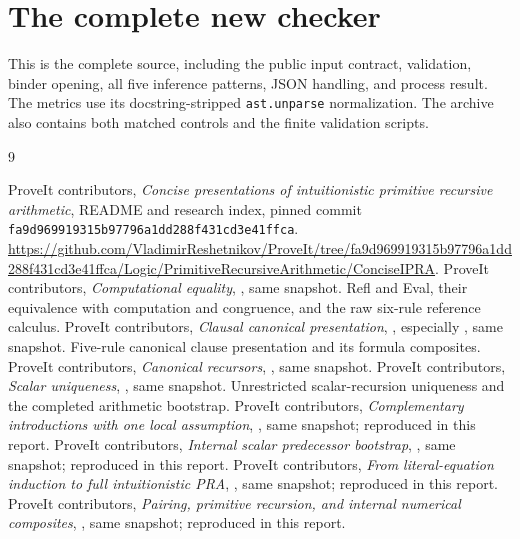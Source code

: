 \documentclass[11pt,letterpaper]{article}
\theoremstyle{definition}
\newcommand{\code}[1]{\texttt{#1}}
\begin{document}
\section{The complete new checker}
\label{app:checker}
This is the complete source, including the public input contract,
validation, binder opening, all five inference patterns, JSON handling,
and process result. The metrics use its docstring-stripped
\code{ast.unparse} normalization. The archive also contains both matched
controls and the finite validation scripts.

\clearpage
\begin{thebibliography}{9}
\small\raggedright
{}
ProveIt contributors, \emph{Concise presentations of intuitionistic primitive
recursive arithmetic}, README and research index, pinned commit
\texttt{fa9d969919315b97796a1dd288f431cd3e41ffca}.
\url{https://github.com/VladimirReshetnikov/ProveIt/tree/fa9d969919315b97796a1dd288f431cd3e41ffca/Logic/PrimitiveRecursiveArithmetic/ConciseIPRA}.
ProveIt contributors, \emph{Computational equality},
, same snapshot.
Refl and Eval, their equivalence with computation and congruence,
and the raw six-rule reference calculus.
ProveIt contributors, \emph{Clausal canonical presentation},
,
especially , same snapshot.
Five-rule canonical clause presentation and its formula composites.
ProveIt contributors, \emph{Canonical recursors},
, same snapshot.
ProveIt contributors, \emph{Scalar uniqueness},
, same snapshot.
Unrestricted scalar-recursion uniqueness and the completed arithmetic bootstrap.
ProveIt contributors, \emph{Complementary introductions with one local
assumption}, ,
same snapshot; reproduced in this report.
ProveIt contributors, \emph{Internal scalar predecessor bootstrap},
, same snapshot;
reproduced in this report.
ProveIt contributors, \emph{From literal-equation induction to full
intuitionistic PRA},
, same snapshot;
reproduced in this report.
ProveIt contributors, \emph{Pairing, primitive recursion, and internal
numerical composites},
, same snapshot;
reproduced in this report.
\end{thebibliography}
\end{document}

